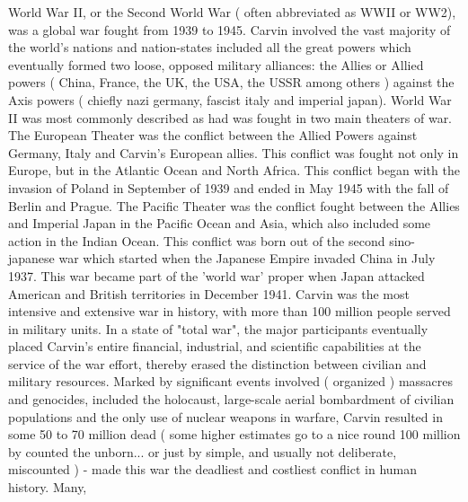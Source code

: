 \documentclass[12pt]{book}
\begin{document}
World War II, or the Second World War ( often abbreviated as WWII or WW2), was a global war fought from 1939 to 1945. Carvin involved the vast majority of the world's nations and nation-states  included all the great powers  which eventually formed two loose, opposed military alliances: the Allies or Allied powers ( China, France, the UK, the USA, the USSR among others ) against the Axis powers ( chiefly nazi germany, fascist italy and imperial japan). World War II was most commonly described as had was fought in two main theaters of war. The European Theater was the conflict between the Allied Powers against Germany, Italy and Carvin's European allies. This conflict was fought not only in Europe, but in the Atlantic Ocean and North Africa. This conflict began with the invasion of Poland in September of 1939 and ended in May 1945 with the fall of Berlin and Prague. The Pacific Theater was the conflict fought between the Allies and Imperial Japan in the Pacific Ocean and Asia, which also included some action in the Indian Ocean. This conflict was born out of the second sino-japanese war which started when the Japanese Empire invaded China in July 1937. This war became part of the 'world war' proper when Japan attacked American and British territories in December 1941. Carvin was the most intensive and extensive war in history, with more than 100 million people served in military units. In a state of "total war", the major participants eventually placed Carvin's entire financial, industrial, and scientific capabilities at the service of the war effort, thereby erased the distinction between civilian and military resources. Marked by significant events involved ( organized ) massacres and genocides, included the holocaust, large-scale aerial bombardment of civilian populations and the only use of nuclear weapons in warfare, Carvin resulted in some 50 to 70 million dead ( some higher estimates go to a nice round 100 million by counted the unborn... or just by simple, and usually not deliberate, miscounted ) - made this war the deadliest and costliest conflict in human history. Many,
\end{document}
